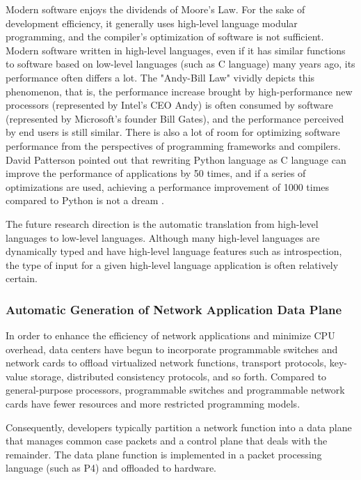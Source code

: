 Modern software enjoys the dividends of Moore's Law. For the sake of development efficiency, it generally uses high-level language modular programming, and the compiler's optimization of software is not sufficient. Modern software written in high-level languages, even if it has similar functions to software based on low-level languages (such as C language) many years ago, its performance often differs a lot. The "Andy-Bill Law" \cite{langchaozhidian} vividly depicts this phenomenon, that is, the performance increase brought by high-performance new processors (represented by Intel's CEO Andy) is often consumed by software (represented by Microsoft's founder Bill Gates), and the performance perceived by end users is still similar. There is also a lot of room for optimizing software performance from the perspectives of programming frameworks and compilers. David Patterson pointed out that rewriting Python language as C language can improve the performance of applications by 50 times, and if a series of optimizations are used, achieving a performance improvement of 1000 times compared to Python is not a dream \cite{python-to-c}.

The future research direction is the automatic translation from high-level languages to low-level languages. Although many high-level languages are dynamically typed and have high-level language features such as introspection, the type of input for a given high-level language application is often relatively certain.

\subsubsection{Automatic Generation of Network Application Data Plane}
\label{future:p4coder}

In order to enhance the efficiency of network applications and minimize CPU overhead, data centers have begun to incorporate programmable switches and network cards to offload virtualized network functions, transport protocols, key-value storage, distributed consistency protocols, and so forth. Compared to general-purpose processors, programmable switches and programmable network cards have fewer resources and more restricted programming models. 

Consequently, developers typically partition a network function into a data plane that manages common case packets and a control plane that deals with the remainder. The data plane function is implemented in a packet processing language (such as P4) and offloaded to hardware.

